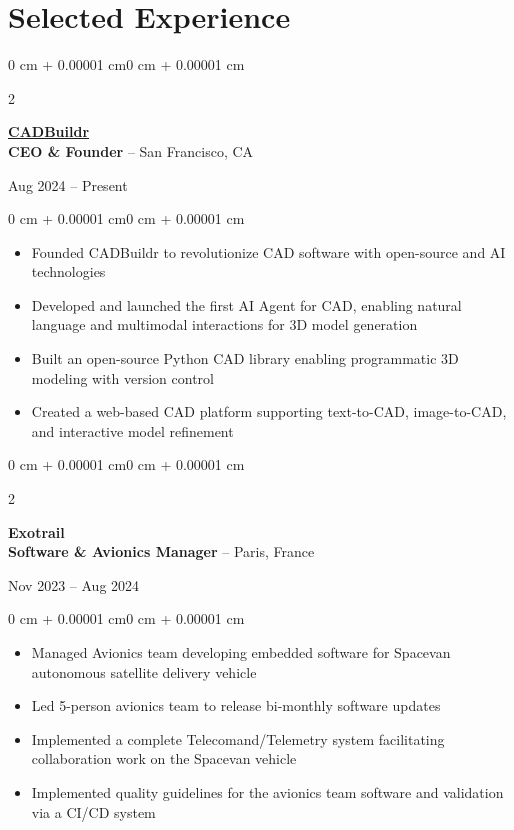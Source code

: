 \documentclass[10pt, letterpaper]{article}
\newenvironment{highlights}{
    \begin{itemize}[
        topsep=0.10 cm,
        parsep=0.10 cm,
        partopsep=0pt,
        itemsep=0pt,
        leftmargin=0 cm + 10pt
    ]
}{
    \end{itemize}
}
\newenvironment{onecolentry}{
    \begin{adjustwidth}{0 cm + 0.00001 cm}{0 cm + 0.00001 cm}
}{
    \end{adjustwidth}
}
\newenvironment{twocolentry}[2][]{
    \onecolentry
    \def\secondColumn{#2}
    \setcolumnwidth{\fill, 4.5 cm}
    \begin{paracol}{2}
}{
    \switchcolumn \raggedleft \secondColumn
    \end{paracol}
    \endonecolentry
}
\begin{document}
    \section{Selected Experience}
    \begin{twocolentry}{Aug 2024 -- Present}
        \textbf{\href{https://cadbuildr.com}{CADBuildr}} \\
        \textbf{CEO \& Founder} -- San Francisco, CA
    \end{twocolentry}
    \begin{onecolentry}
        \begin{highlights}
            \item Founded CADBuildr to revolutionize CAD software with open-source and AI technologies
            \item Developed and launched the first AI Agent for CAD, enabling natural language and multimodal interactions for 3D model generation
            \item Built an open-source Python CAD library enabling programmatic 3D modeling with version control
            \item Created a web-based CAD platform supporting text-to-CAD, image-to-CAD, and interactive model refinement
        \end{highlights}
    \end{onecolentry}

    \vspace{0.5cm}

    \begin{twocolentry}{Nov 2023 -- Aug 2024}
        \textbf{Exotrail} \\
        \textbf{Software \& Avionics Manager} -- Paris, France
    \end{twocolentry}
    \begin{onecolentry}
        \begin{highlights}
            \item Managed Avionics team developing embedded software for Spacevan autonomous satellite delivery vehicle
            \item Led 5-person avionics team to release bi-monthly software updates
            \item Implemented a complete Telecomand/Telemetry system facilitating collaboration work on the Spacevan vehicle
            \item Implemented quality guidelines for the avionics team software and validation via a CI/CD system
        \end{highlights}
    \end{onecolentry}
\end{document}

